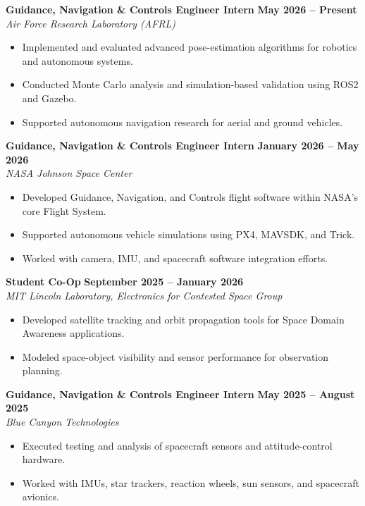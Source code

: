 \documentclass[10pt]{article}
\begin{document}
	\textbf{Guidance, Navigation \& Controls Engineer Intern} \hfill \textbf{May 2026 -- Present} \\
	\emph{Air Force Research Laboratory (AFRL)}
	\begin{itemize}
		\item Implemented and evaluated advanced pose-estimation algorithms for robotics and autonomous systems.
		\item Conducted Monte Carlo analysis and simulation-based validation using ROS2 and Gazebo.
		\item Supported autonomous navigation research for aerial and ground vehicles.
	\end{itemize}
	
	\textbf{Guidance, Navigation \& Controls Engineer Intern} \hfill \textbf{January 2026 -- May 2026} \\
	\emph{NASA Johnson Space Center}
	\begin{itemize}
		\item Developed Guidance, Navigation, and Controls flight software within NASA's core Flight System.
		\item Supported autonomous vehicle simulations using PX4, MAVSDK, and Trick.
		\item Worked with camera, IMU, and spacecraft software integration efforts.
	\end{itemize}
	
	\textbf{Student Co-Op} \hfill \textbf{September 2025 -- January 2026} \\
	\emph{MIT Lincoln Laboratory, Electronics for Contested Space Group}
	\begin{itemize}
		\item Developed satellite tracking and orbit propagation tools for Space Domain Awareness applications.
		\item Modeled space-object visibility and sensor performance for observation planning.
	\end{itemize}
	
	\textbf{Guidance, Navigation \& Controls Engineer Intern} \hfill \textbf{May 2025 -- August 2025} \\
	\emph{Blue Canyon Technologies}
	\begin{itemize}
		\item Executed testing and analysis of spacecraft sensors and attitude-control hardware.
		\item Worked with IMUs, star trackers, reaction wheels, sun sensors, and spacecraft avionics.
	\end{itemize}
	
\end{document}
